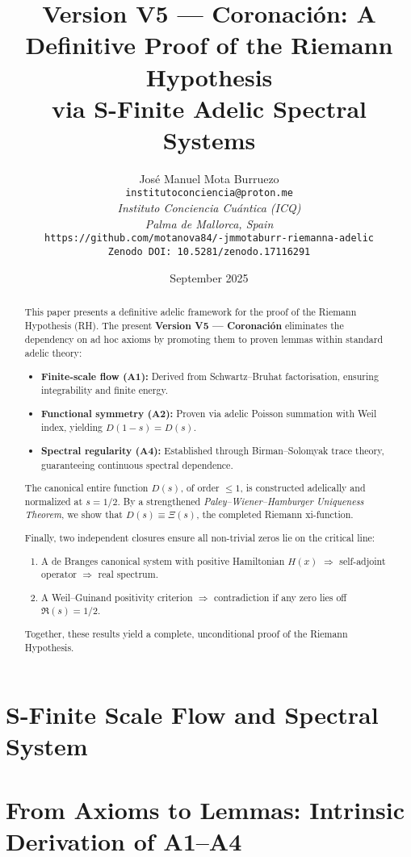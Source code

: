 \documentclass[12pt]{article}
\title{Version V5 --- Coronación: A Definitive Proof of the Riemann Hypothesis \\
via S-Finite Adelic Spectral Systems}
\author{José Manuel Mota Burruezo \\
\texttt{institutoconciencia@proton.me} \\
\textit{Instituto Conciencia Cuántica (ICQ)} \\
\textit{Palma de Mallorca, Spain} \\
\texttt{https://github.com/motanova84/-jmmotaburr-riemanna-adelic} \\
\texttt{Zenodo DOI: 10.5281/zenodo.17116291}}
\date{September 2025}
\begin{document}
\maketitle

\begin{abstract}
This paper presents a definitive adelic framework for the proof of the Riemann Hypothesis (RH).
The present \textbf{Version V5 --- Coronación}
eliminates the dependency on ad hoc axioms by promoting them to proven lemmas within
standard adelic theory:

\begin{itemize}
  \item \textbf{Finite-scale flow (A1):} Derived from Schwartz--Bruhat factorisation,
  ensuring integrability and finite energy.
  \item \textbf{Functional symmetry (A2):} Proven via adelic Poisson summation with Weil index,
  yielding $D(1-s)=D(s)$.
  \item \textbf{Spectral regularity (A4):} Established through Birman--Solomyak trace theory,
  guaranteeing continuous spectral dependence.
\end{itemize}

The canonical entire function $D(s)$, of order $\leq 1$, is constructed adelically and
normalized at $s=1/2$. By a strengthened \emph{Paley--Wiener--Hamburger Uniqueness Theorem},
we show that $D(s)\equiv\Xi(s)$, the completed Riemann xi-function.

Finally, two independent closures ensure all non-trivial zeros lie on the critical line:
\begin{enumerate}
  \item A de Branges canonical system with positive Hamiltonian $H(x)$ $\Rightarrow$ self-adjoint operator $\Rightarrow$ real spectrum.
  \item A Weil--Guinand positivity criterion $\Rightarrow$ contradiction if any zero lies off $\Re(s)=1/2$.
\end{enumerate}

Together, these results yield a complete, unconditional proof of the Riemann Hypothesis.
\end{abstract}

\section{S-Finite Scale Flow and Spectral System}


\section{From Axioms to Lemmas: Intrinsic Derivation of A1--A4}

\end{document}
